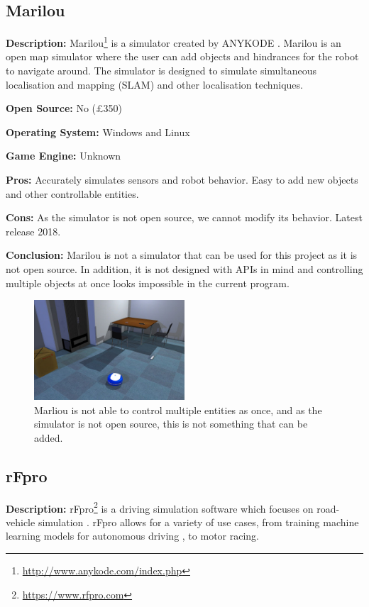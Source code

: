 \subsection{Marilou}
\textbf{Description:} Marilou\footnote{\url{http://www.anykode.com/index.php}} is a simulator created by ANYKODE \cite{Marilou_Web}. Marilou is an open map simulator where the user can add objects and hindrances for the robot to navigate around. The simulator is designed to simulate simultaneous localisation and mapping (SLAM) and other localisation techniques. 

\textbf{Open Source:} No (£350)

\textbf{Operating System:} Windows and Linux

\textbf{Game Engine:} Unknown

\textbf{Pros:} Accurately simulates sensors and robot behavior. Easy to add new objects and other controllable entities. 

\textbf{Cons:} As the simulator is not open source, we cannot modify its behavior. Latest release 2018.

\textbf{Conclusion:} Marilou is not a simulator that can be used for this project as it is not open source. In addition, it is not designed with APIs in mind and controlling multiple objects at once looks impossible in the current program. 

\begin{figure}[H]
    \centering
    \includegraphics[width=0.5\textwidth]{03_Background/Appendix/Simulators/Marilou.jpg}
    \caption[Marilou]{Marliou is not able to control multiple entities as once, and as the simulator is not open source, this is not something that can be added.}
\end{figure}


\subsection{rFpro}
\textbf{Description:} rFpro\footnote{\url{https://www.rfpro.com}} is a driving simulation software which focuses on road-vehicle simulation \cite{rFpro_Web}. rFpro allows for a variety of use cases, from training machine learning models for autonomous driving \cite{rFpro_ML}, to motor racing.

